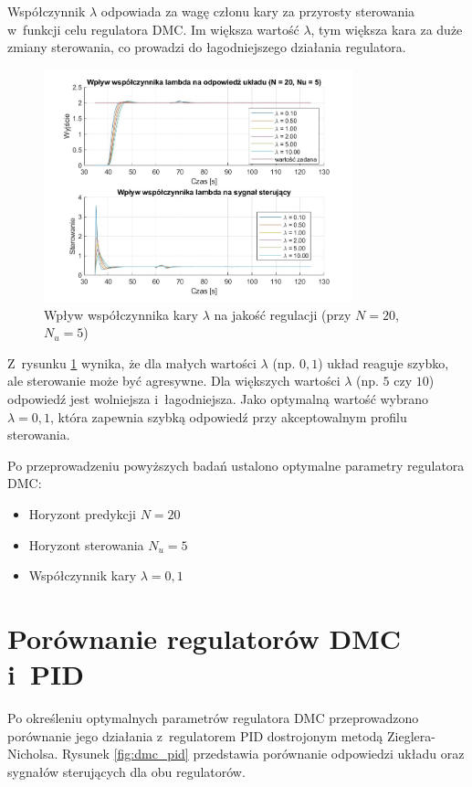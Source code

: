 \documentclass[a4paper,titlepage,11pt,floatssmall]{mwrep}
\begin{document}
Współczynnik $\lambda$ odpowiada za wagę członu kary za przyrosty sterowania w~funkcji celu regulatora DMC. Im większa wartość $\lambda$, tym większa kara za duże zmiany sterowania, co prowadzi do łagodniejszego działania regulatora.

\begin{figure}[H]
    \centering
    \includegraphics[width=0.8\textwidth]{kod/wykresy/lambda_porownanie.jpg}
    \caption{Wpływ współczynnika kary $\lambda$ na jakość regulacji (przy $N = 20$, $N_u = 5$)}
    \label{fig:lambda_comparison}
\end{figure}

Z~rysunku \ref{fig:lambda_comparison} wynika, że dla małych wartości $\lambda$ (np. $0,1$) układ reaguje szybko, ale sterowanie może być agresywne. Dla większych wartości $\lambda$ (np. $5$ czy $10$) odpowiedź jest wolniejsza i~łagodniejsza. Jako optymalną wartość wybrano $\lambda = 0,1$, która zapewnia szybką odpowiedź przy akceptowalnym profilu sterowania.

Po przeprowadzeniu powyższych badań ustalono optymalne parametry regulatora DMC:
\begin{itemize}
    \item Horyzont predykcji $N = 20$
    \item Horyzont sterowania $N_u = 5$
    \item Współczynnik kary $\lambda = 0,1$
\end{itemize}

\section{Porównanie regulatorów DMC i~PID}

Po określeniu optymalnych parametrów regulatora DMC przeprowadzono porównanie jego działania z~regulatorem PID dostrojonym metodą Zieglera-Nicholsa. Rysunek \ref{fig:dmc_pid} przedstawia porównanie odpowiedzi układu oraz sygnałów sterujących dla obu regulatorów.
\end{document}
